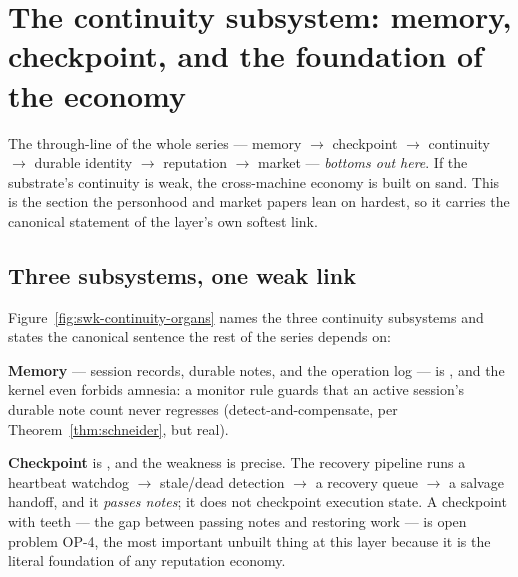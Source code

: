\documentclass[11pt,a4paper]{article}
\theoremstyle{definition}
\theoremstyle{remark}
\begin{document}
\pdexercisepointer{\ref{ex:swk-monitor-rules-precommit}}{\ref{ex:swk-op5-oracle}}{\pageref{ex:swk-monitor-rules-precommit}}

\section{The continuity subsystem: memory, checkpoint, and the foundation of the economy}
\label{sec:continuity}

The through-line of the whole series --- memory $\to$ checkpoint $\to$ continuity
$\to$ durable identity $\to$ reputation $\to$ market --- \emph{bottoms out here}. If
the substrate's continuity is weak, the cross-machine economy is built on sand.
This is the section the personhood and market papers lean on hardest, so it carries
the canonical statement of the layer's own softest link.



\subsection{Three subsystems, one weak link}

Figure~\ref{fig:swk-continuity-organs} names the three continuity subsystems and states
the canonical sentence the rest of the series depends on:


\textbf{Memory} --- session records, durable notes, and the operation log --- is
\Built, and the kernel even forbids amnesia: a monitor rule guards that an active
session's durable note count never regresses (detect-and-compensate, per
Theorem~\ref{thm:schneider}, but real).

\ifpdmargincolumn\pdheartbeatsketch\fi
\textbf{Checkpoint} is \BuiltWeak, and the weakness is precise. The recovery
pipeline runs a heartbeat watchdog $\to$ stale/dead detection $\to$ a recovery
queue $\to$ a salvage handoff, and it \emph{passes notes}; it does not checkpoint
execution state. A checkpoint with teeth --- the gap between passing notes and
restoring work --- is open problem OP-4, the most important unbuilt thing at this
layer because it is the literal foundation of any reputation economy.
\end{document}
